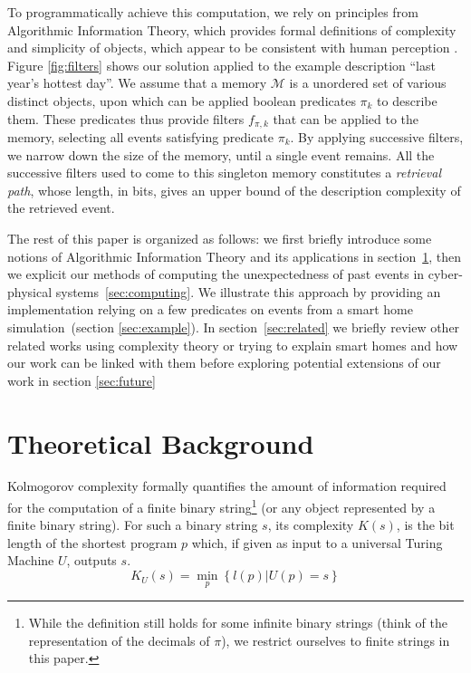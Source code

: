 \documentclass[conference]{IEEEtran}
\begin{document}
To programmatically achieve this computation, we rely on principles from
Algorithmic Information Theory, which provides formal definitions of complexity
and simplicity of objects, which appear to be consistent with human perception
\cite{li_introduction_2008, dessalles2011coincidences, delahaye_numerical_2012}.
 Figure \ref{fig:filters} shows our solution applied to the example description
 ``last year's hottest day''. We assume that
a memory $\mathcal{M}$ is a unordered set of various distinct objects, upon
which can be applied boolean predicates $\pi_{k}$ to describe them. These predicates thus
provide filters $f_{\pi, k}$ that can be applied to the memory, selecting all events
satisfying predicate $\pi_{k}$. By applying successive
filters, we narrow down the size of the memory, until a single event remains.
All the successive filters used to come to this singleton memory constitutes a
\emph{retrieval path}, whose length, in bits, gives an upper bound of the
description complexity of the retrieved event.

The rest of this paper is organized as follows: we first briefly introduce some notions of
Algorithmic Information Theory and its applications in section~\ref{sec:theory},
then we explicit our methods of computing the unexpectedness of past events in
cyber-physical systems~\ref{sec:computing}. We illustrate this approach by
providing an implementation relying on a few predicates on events from a smart
home simulation~(section \ref{sec:example}). In section~\ref{sec:related} we briefly
review other related works using complexity theory or trying to explain smart
homes and how our work can be linked with them before exploring potential
extensions of our work in section \ref{sec:future}

\section{Theoretical Background}
\label{sec:theory}
Kolmogorov complexity formally quantifies the amount of information required
for the computation of a finite binary string\footnote{While the definition still
holds for some infinite binary strings (think of the representation of the
decimals of $\pi$), we restrict ourselves to finite strings in this paper.} (or
any object represented by a finite binary
string)\cite{kolmogorov_three_1965,li_introduction_2008}. For such a binary
string $s$, its complexity $K(s)$, is the bit length of the shortest program $p$
which, if given as input to a universal Turing Machine $U$, outputs $s$.
\begin{equation}
  \label{eq:kolmo_def}
  K_{U}(s) = \min_{p}\left\{l(p)|U(p)=s\right\}
\end{equation}
\end{document}
